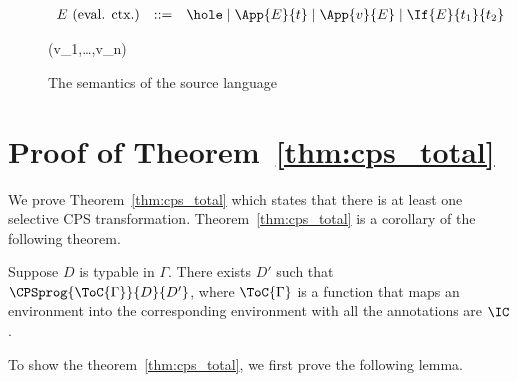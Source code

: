 \begin{figure}[t]
\[
\begin{array}{lrl}
E\text{ (eval. ctx.)} &::=& \hole \mid \App{E}{t} \mid \App{v}{E} \mid \If{E}{t_1}{t_2}
\end{array}
\]


 { \red \Denote{\OP}(v_1,\dots,v_n)}








\caption{The semantics of the source language}
\label{fig:source-semantics}
\end{figure}


\section{Proof of Theorem~\ref{thm:cps_total}}

We prove Theorem~\ref{thm:cps_total} which states that there is at least
one selective CPS transformation.
Theorem~\ref{thm:cps_total} is a corollary of the following theorem.

\begin{theorem}
Suppose $D$ is typable in $\Gamma$. There exists $D'$ such that
$\CPSprog{\ToC{\Gamma}}{D}{D'}$, where $\ToC{\Gamma}$ is a function that
maps an environment into the corresponding environment
with all the annotations are $\IC$.
\end{theorem}

To show the theorem~\ref{thm:cps_total},
we first prove the following lemma.


